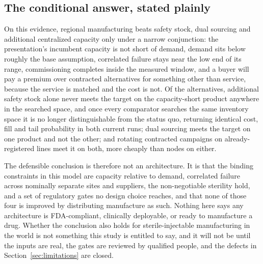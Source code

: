\subsection{The conditional answer, stated plainly}

On this evidence, regional manufacturing beats safety stock, dual sourcing and additional centralized
capacity only under a narrow conjunction: the presentation's incumbent capacity is not short of
demand, demand sits below roughly the base assumption, correlated failure stays near the low end of
its range, commissioning completes inside the measured window, and a buyer will pay a premium over
contracted alternatives for something other than service, because the service is matched and the cost
is not. Of the alternatives, additional safety stock alone never meets the target on the
capacity-short product anywhere in the searched space, and once every comparator searches the same
inventory space it is no longer distinguishable from the status quo, returning identical cost, fill
and tail probability in both current runs; dual sourcing meets the target on one product and not the
other; and rotating contracted campaigns on already-registered lines meet it on both, more cheaply
than nodes on either.

The defensible conclusion is therefore not an architecture. It is that the binding constraints in this
model are capacity relative to demand, correlated failure across nominally separate sites and
suppliers, the non-negotiable sterility hold, and a set of regulatory gates no design choice reaches,
and that none of those four is improved by distributing manufacture as such. Nothing here says any
architecture is FDA-compliant, clinically deployable, or ready to manufacture a drug. Whether the
conclusion also holds for sterile-injectable manufacturing in the world is not something this study is
entitled to say, and it will not be until the inputs are real, the gates are reviewed by qualified
people, and the defects in Section~\ref{sec:limitations} are closed.
